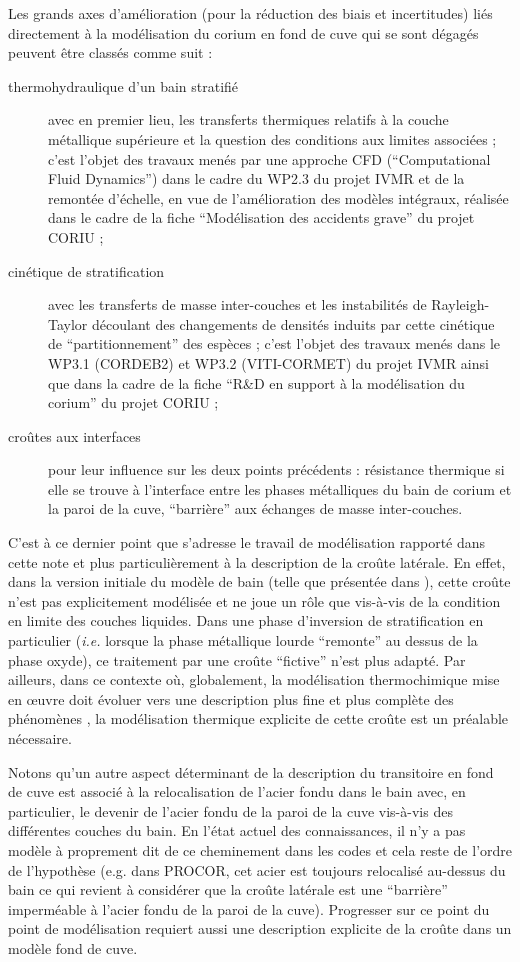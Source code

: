 Les grands axes d'amélioration (pour la réduction des biais et incertitudes) liés directement à la modélisation du corium en fond de cuve qui se sont dégagés peuvent être classés comme suit \cite{LeTellier2014,Fichot2018} :
\begin{description}
 \item[thermohydraulique d'un bain stratifié] avec en premier lieu, les transferts thermiques relatifs à la couche métallique supérieure et la question des conditions aux limites associées ; c'est l'objet des travaux menés par une approche CFD (``Computational Fluid Dynamics'') dans le cadre du WP2.3 du projet IVMR et de la remontée d'échelle, en vue de l'amélioration des modèles intégraux, réalisée dans le cadre de la fiche ``Modélisation des accidents grave'' du projet CORIU ; 
 \item[cinétique de stratification] avec les transferts de masse inter-couches et les instabilités de Rayleigh-Taylor découlant des changements de densités induits par cette cinétique de ``partitionnement'' des espèces ; c'est l'objet des travaux menés dans le WP3.1 (CORDEB2) et WP3.2 (VITI-CORMET) du projet IVMR ainsi que dans la cadre de la fiche ``R\&D en support à la modélisation du corium'' du projet CORIU ;
 \item[croûtes aux interfaces] pour leur influence sur les deux points précédents : résistance thermique si elle se trouve à l'interface entre les phases métalliques du bain de corium et la paroi de la cuve, ``barrière'' aux échanges de masse inter-couches.
\end{description}
C'est à ce dernier point que s'adresse le travail de modélisation rapporté dans cette note et plus particulièrement à la description de la croûte latérale. En effet, dans la version initiale du modèle de bain (telle que présentée dans \cite{LeTellier2014}), cette croûte n'est pas explicitement modélisée et ne joue un rôle que vis-à-vis de la condition en limite des couches liquides. Dans une phase d'inversion de stratification en particulier (\textit{i.e.} lorsque la phase métallique lourde ``remonte'' au dessus de la phase oxyde), ce traitement par une croûte ``fictive'' n'est plus adapté. Par ailleurs, dans ce contexte où, globalement, la modélisation thermochimique mise en \oe{}uvre doit évoluer vers une description plus fine et plus complète des phénomènes \cite{Fichot2015}, la modélisation thermique explicite de cette croûte est un préalable nécessaire. 
\begin{remark}
Notons qu'un autre aspect déterminant de la description du transitoire en fond de cuve est associé à la relocalisation de l'acier fondu dans le bain avec, en particulier, le devenir de l'acier fondu de la paroi de la cuve vis-à-vis des différentes couches du bain. En l'état actuel des connaissances, il n'y a pas modèle à proprement dit de ce cheminement dans les codes et cela reste de l'ordre de l'hypothèse (e.g. dans PROCOR, cet acier est toujours relocalisé au-dessus du bain ce qui revient à considérer que la croûte latérale est une ``barrière'' imperméable à l'acier fondu de la paroi de la cuve). Progresser sur ce point du point de modélisation requiert aussi une description explicite de la croûte dans un modèle fond de cuve.
\end{remark}

